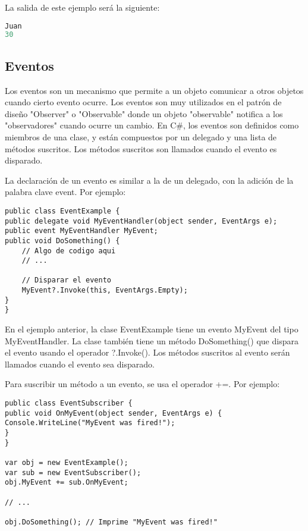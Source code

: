\documentclass[executivepaper]{article}
\begin{document}
La salida de este ejemplo será la siguiente:

\begin{lstlisting}[language=python]
Juan
30
\end{lstlisting}

\subsection{Eventos}

Los eventos son un mecanismo que permite a un objeto comunicar a otros objetos cuando cierto evento ocurre. Los eventos son muy utilizados en el patrón de diseño "Observer" o "Observable" donde un objeto "observable" notifica a los "observadores" cuando ocurre un cambio. En C\#, los eventos son definidos como miembros de una clase, y están compuestos por un delegado y una lista de métodos suscritos. Los métodos suscritos son llamados cuando el evento es disparado.

La declaración de un evento es similar a la de un delegado, con la adición de la palabra clave event. Por ejemplo:

\begin{lstlisting}
public class EventExample {
public delegate void MyEventHandler(object sender, EventArgs e);
public event MyEventHandler MyEvent;
public void DoSomething() {
    // Algo de codigo aqui
    // ...

    // Disparar el evento
    MyEvent?.Invoke(this, EventArgs.Empty);
}
}
\end{lstlisting}

En el ejemplo anterior, la clase EventExample tiene un evento MyEvent del tipo MyEventHandler. La clase también tiene un método DoSomething() que dispara el evento usando el operador ?.Invoke(). Los métodos suscritos al evento serán llamados cuando el evento sea disparado.

Para suscribir un método a un evento, se usa el operador +=. Por ejemplo:

\begin{lstlisting}[language={[Sharp]C}]
public class EventSubscriber {
public void OnMyEvent(object sender, EventArgs e) {
Console.WriteLine("MyEvent was fired!");
}
}

var obj = new EventExample();
var sub = new EventSubscriber();
obj.MyEvent += sub.OnMyEvent;

// ...

obj.DoSomething(); // Imprime "MyEvent was fired!"
\end{lstlisting}
\end{document}
